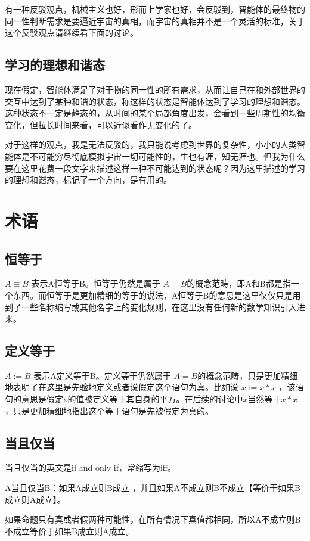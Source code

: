 \documentclass[12pt,oneside]{book}
\begin{document}
有一种反驳观点，机械主义也好，形而上学家也好，会反驳到，智能体的最终物的同一性判断需求是要逼近宇宙的真相，而宇宙的真相并不是一个灵活的标准，关于这个反驳观点请继续看下面的讨论。

\section{学习的理想和谐态}
现在假定，智能体满足了对于物的同一性的所有需求，从而让自己在和外部世界的交互中达到了某种和谐的状态，称这样的状态是智能体达到了学习的理想和谐态。这种状态不一定是静态的，从时间的某个局部角度出发，会看到一些周期性的均衡变化，但拉长时间来看，可以近似看作无变化的了。

对于这样的观点，我是无法反驳的，我只能说考虑到世界的复杂性，小小的人类智能体是不可能穷尽彻底模拟宇宙一切可能性的，生也有涯，知无涯也。但我为什么要在这里花费一段文字来描述这样一种不可能达到的状态呢？因为这里描述的学习的理想和谐态，标记了一个方向，是有用的。





\chapter{术语}
\section{恒等于}
$A \equiv B$ 表示A恒等于B。恒等于仍然是属于 $A=B$的概念范畴，即A和B都是指一个东西。而恒等于是更加精细的等于的说法，A恒等于B的意思是这里仅仅只是用到了一些名称缩写或其他名字上的变化规则，在这里没有任何新的数学知识引入进来。

\section{定义等于}
$A := B$ 表示A定义等于B。定义等于仍然属于 $A=B$的概念范畴，只是更加精细地表明了在这里是先验地定义或者说假定这个语句为真。比如说 $x := x*x$ ，该语句的意思是假定x的值被定义等于其自身的平方。在后续的讨论中$x$当然等于$x*x$，只是更加精细地指出这个等于语句是先被假定为真的。


\section{当且仅当}
当且仅当的英文是if and only if，常缩写为iff。

A当且仅当B：如果A成立则B成立 ，并且如果A不成立则B不成立【等价于如果B成立则A成立】。

如果命题只有真或者假两种可能性，在所有情况下真值都相同，所以A不成立则B不成立等价于如果B成立则A成立。
\end{document}
